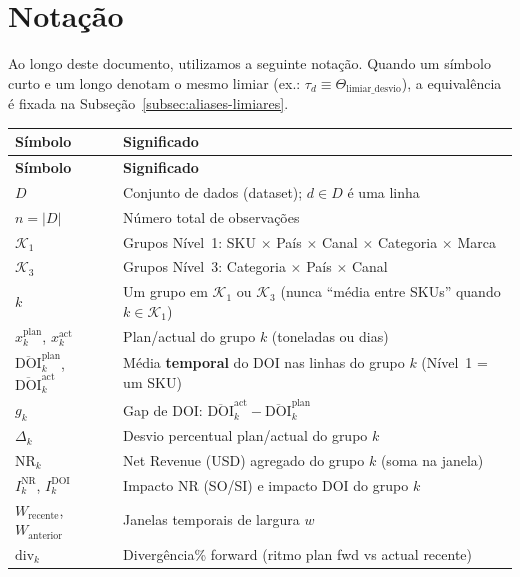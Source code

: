 \documentclass[a4paper, 12pt]{report}
\theoremstyle{definition}
\theoremstyle{remark}
\begin{document}
\section{Nota\c{c}\~ao}

Ao longo deste documento, utilizamos a seguinte nota\c{c}\~ao.
Quando um s\'imbolo curto e um longo denotam o mesmo limiar
(ex.: $\tau_d \equiv \Theta_{\text{limiar\_desvio}}$), a equival\^encia
\'e fixada na Subse\c{c}\~ao~\ref{subsec:aliases-limiares}.

\begin{longtable}{lp{9.5cm}}
  \toprule
  \textbf{S\'imbolo} & \textbf{Significado} \\
  \midrule
  \endfirsthead
  \toprule
  \textbf{S\'imbolo} & \textbf{Significado} \\
  \midrule
  \endhead
  \bottomrule
  \endfoot
  \bottomrule
  \endlastfoot
  $D$ & Conjunto de dados (dataset); $d \in D$ \'e uma linha \\
  $n = |D|$ & N\'umero total de observa\c{c}\~oes \\
  $\mathcal{K}_1$ & Grupos N\'ivel~1:
    SKU $\times$ Pa\'is $\times$ Canal $\times$ Categoria $\times$ Marca \\
  $\mathcal{K}_3$ & Grupos N\'ivel~3: Categoria $\times$ Pa\'is $\times$ Canal \\
  $k$ & Um grupo em $\mathcal{K}_1$ ou $\mathcal{K}_3$ (nunca ``m\'edia entre SKUs''
    quando $k \in \mathcal{K}_1$) \\
  $x^{\text{plan}}_k$, $x^{\text{act}}_k$ & Plan/actual do grupo $k$ (toneladas ou dias) \\
  $\overline{\text{DOI}}^{\text{plan}}_k$, $\overline{\text{DOI}}^{\text{act}}_k$ &
    M\'edia \textbf{temporal} do DOI nas linhas do grupo $k$ (N\'ivel~1 = um SKU) \\
  $g_k$ & Gap de DOI: $\overline{\text{DOI}}^{\text{act}}_k - \overline{\text{DOI}}^{\text{plan}}_k$ \\
  $\Delta_k$ & Desvio percentual plan/actual do grupo $k$ \\
  $\text{NR}_k$ & Net Revenue (USD) agregado do grupo $k$ (soma na janela) \\
  $I^{\text{NR}}_k$, $I^{\text{DOI}}_k$ & Impacto NR (SO/SI) e impacto DOI do grupo $k$ \\
  $W_{\text{recente}}$, $W_{\text{anterior}}$ & Janelas temporais de largura $w$ \\
  $\text{div}_k$ & Diverg\^encia\% forward (ritmo plan fwd vs actual recente) \\

\end{longtable}
\end{document}
